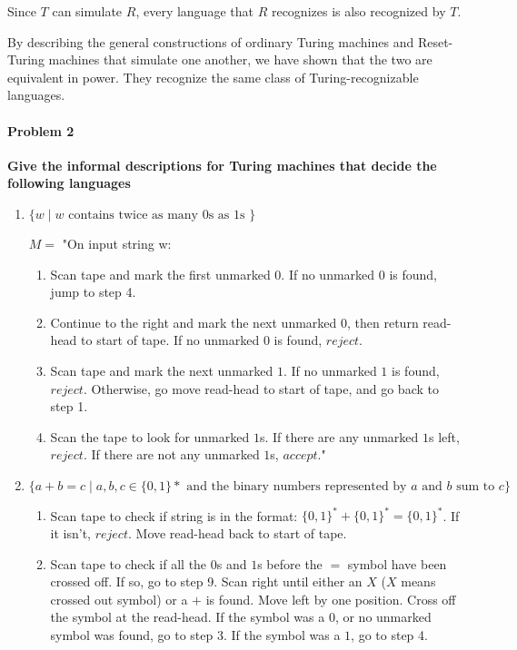 \documentclass{article}
\begin{document}
    \noindent Since $T$ can simulate $R$, every language that $R$ recognizes is also recognized by $T$.\newline
    
    \noindent By describing the general constructions of ordinary Turing machines and Reset-Turing machines that simulate one another, we have shown that the two are equivalent in power. They recognize the same class of Turing-recognizable languages.


\paragraph{Problem 2}
\textbf{Give the informal descriptions for Turing machines that decide the following languages}
\begin{enumerate}[\indent a)]
    \item $\{w \;|\; w \text{ contains twice as many 0s as 1s }\}$
    
	$M = $ "On input string w:
	\begin{enumerate}[\indent 1.]
		\item Scan tape and mark the first unmarked $0$. If no unmarked $0$ is found, jump to step 4.
		\item Continue to the right and mark the next unmarked $0$, then return read-head to start of tape. If no unmarked $0$ is found, $reject$.
		\item Scan tape and mark the next unmarked $1$. If no unmarked $1$ is found, $reject$. Otherwise, go move read-head to start of tape, and go back to step 1.
		\item Scan the tape to look for unmarked $1$s. If there are any unmarked $1$s left, $reject$. If there are not any unmarked $1$s, $accept$."	
    \end{enumerate}


    \item $\{a+b=c \;|\; a,b,c \in \{0,1\}* \text{ and the binary numbers represented by $a$ 
    and $b$ sum to $c$} \}$
    
    \begin{enumerate}[\indent 1.]
		\item Scan tape to check if string is in the format: $\{0,1\}^* + \{0,1\}^* = \{0,1\}^* $. If it isn't, $reject$. Move read-head back to start of tape.
		\item Scan tape to check if all the $0$s and $1$s  before the $=$ symbol have been crossed off. If so, go to step 9. Scan right until either an $X$ ($X$ means crossed out symbol) or a $+$ is found. Move left by one position. Cross off the symbol at the read-head. If the symbol was a $0$, or no unmarked symbol was found, go to step 3. If the symbol was a $1$, go to step 4.
		

\end{enumerate}
\end{enumerate}
\end{document}
